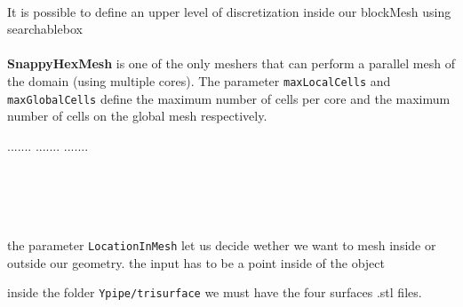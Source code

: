 \paragraph{}It is possible to define an upper level of discretization inside our blockMesh using searchablebox

\paragraph{}\textbf{SnappyHexMesh} is one of the only meshers that can perform a parallel mesh of the domain (using multiple cores). The parameter \texttt{maxLocalCells} and \texttt{maxGlobalCells} define the maximum number of cells per core and the maximum number of cells on the global mesh respectively.



.......
.......
.......\\\\\\\\\


the parameter \texttt{LocationInMesh} let us decide wether we want to mesh inside or outside our geometry. the input has to be a point inside of the object

inside the folder \texttt{Ypipe/trisurface} we must have the four surfaces .stl files.